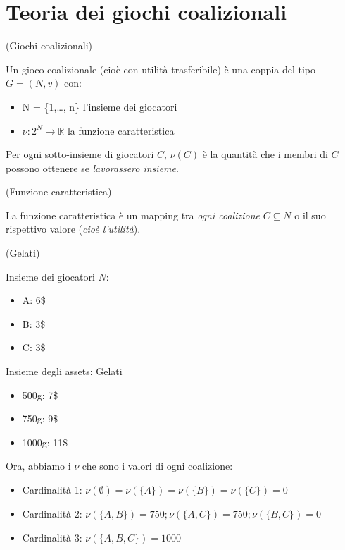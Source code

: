 \section{Teoria dei giochi coalizionali}

\begin{definition}(Giochi coalizionali)

\end{definition}
Un gioco coalizionale (cioè con utilità trasferibile) è una coppia
del tipo $G = (N,v)$ con:
\begin{itemize}
    \item N = \{1,\dots, n\} l'insieme dei giocatori
    \item $\nu: 2^N \rightarrow \mathbb{R}$ la funzione caratteristica
\end{itemize}

Per ogni sotto-insieme di giocatori $C$, $\nu(C)$ è la quantità che i membri di
$C$ possono ottenere se \textit{lavorassero insieme}.

\begin{definition}(Funzione caratteristica)
\end{definition}

La funzione caratteristica è un mapping tra \textit{ogni coalizione} $C
    \subseteq N$ o il suo rispettivo valore (\textit{cioè l'utilità}).

\begin{esempio}(Gelati)
\end{esempio}

Insieme dei giocatori $N$:
\begin{itemize}
    \item A: 6\$
    \item B: 3\$
    \item C: 3\$
\end{itemize}

Insieme degli assets: Gelati
\begin{itemize}
    \item 500g: 7\$
    \item 750g: 9\$
    \item 1000g: 11\$
\end{itemize}

Ora, abbiamo i $\nu$ che sono i valori di ogni coalizione:

\begin{itemize}
    \item Cardinalità 1: $\nu(\emptyset) = \nu(\{A\}) = \nu(\{B\}) = \nu(\{C\}) = 0$
    \item Cardinalità 2: $\nu(\{A,B\}) = 750; \nu(\{A,C\}) = 750; \nu(\{B,C\}) = 0$
    \item Cardinalità 3: $\nu(\{A,B,C\}) = 1000$
\end{itemize}

